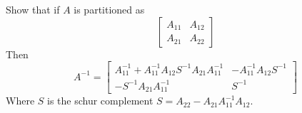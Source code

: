 \documentclass{homework}
\begin{document}
\begin{solution}

   

\end{solution}

\begin{problem}[4-56]
 Show that if $A$ is partitioned as 
 \[
 \begin{bmatrix}
   A_{11} & A_{12} \\
   A_{21} & A_{22}
 \end{bmatrix}
 \]
 Then 
 \[A^{-1} = 
   \begin{bmatrix}
     A_{11}^{-1} + A_{11}^{-1}A_{12}S^{-1}A_{21}A_{11}^{-1} & -A_{11}^{-1}A_{12}S^{-1} \\
     -S^{-1}A_{21}A_{11}^{-1} & S^{-1}
   \end{bmatrix}
 \]
 Where $S$ is the schur complement $S = A_{22} - A_{21}A_{11}^{-1}A_{12}$.
\end{problem}
\end{document}
